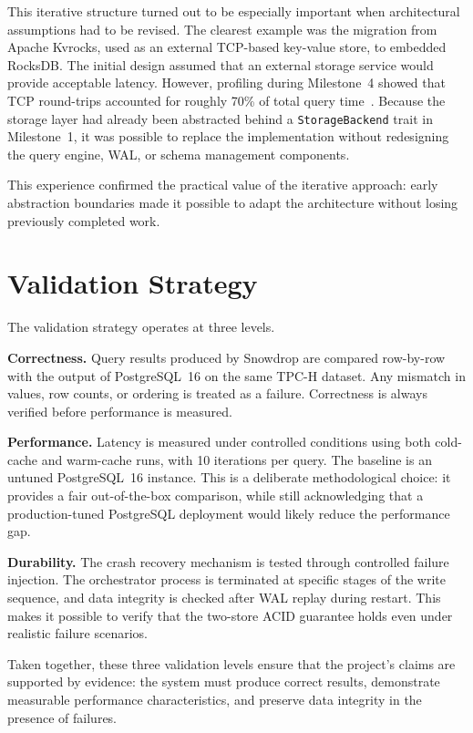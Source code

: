 This iterative structure turned out to be especially important when architectural assumptions had to be revised. The clearest example was the migration from Apache Kvrocks, used as an external TCP-based key-value store, to embedded RocksDB. The initial design assumed that an external storage service would provide acceptable latency. However, profiling during Milestone~4 showed that TCP round-trips accounted for roughly 70\% of total query time~\cite{luo2019}. Because the storage layer had already been abstracted behind a \texttt{StorageBackend} trait in Milestone~1, it was possible to replace the implementation without redesigning the query engine, WAL, or schema management components.

This experience confirmed the practical value of the iterative approach: early abstraction boundaries made it possible to adapt the architecture without losing previously completed work.

\section{Validation Strategy}

The validation strategy operates at three levels.

\textbf{Correctness.} Query results produced by Snowdrop are compared row-by-row with the output of PostgreSQL~16 on the same TPC-H dataset. Any mismatch in values, row counts, or ordering is treated as a failure. Correctness is always verified before performance is measured.

\textbf{Performance.} Latency is measured under controlled conditions using both cold-cache and warm-cache runs, with 10 iterations per query. The baseline is an untuned PostgreSQL~16 instance. This is a deliberate methodological choice: it provides a fair out-of-the-box comparison, while still acknowledging that a production-tuned PostgreSQL deployment would likely reduce the performance gap.

\textbf{Durability.} The crash recovery mechanism is tested through controlled failure injection. The orchestrator process is terminated at specific stages of the write sequence, and data integrity is checked after WAL replay during restart. This makes it possible to verify that the two-store ACID guarantee holds even under realistic failure scenarios.

Taken together, these three validation levels ensure that the project’s claims are supported by evidence: the system must produce correct results, demonstrate measurable performance characteristics, and preserve data integrity in the presence of failures.
